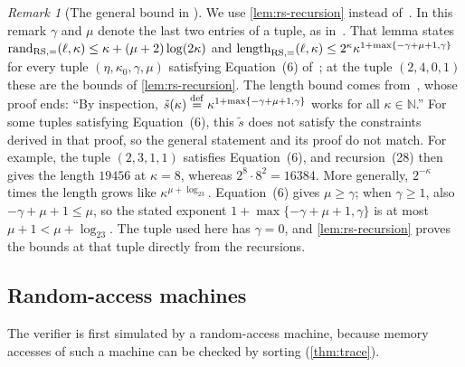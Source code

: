 \documentclass[11pt,letterpaper]{article}
\theoremstyle{definition}
\theoremstyle{remark}
\newtheorem{remark}[theorem]{Remark}
\newcommand{\lgx}{\log_2}
\begin{document}
\begin{remark}[The general bound in {\cite[Lemma~C.1]{BCGT13}}]\label{rem:bcgt-c1}
We use \cref{lem:rs-recursion} instead of~\cite[Lemma~C.1]{BCGT13}.
In this remark \(\gamma\) and \(\mu\) denote the last two entries of a
tuple, as in~\cite{BCGT13}. That lemma states
\(\mathrm{rand}_{\rm RS,=}(\ell,\kappa)\le\kappa+(\mu+2)\log(2\kappa)\)
and
\(\mathrm{length}_{\rm RS,=}(\ell,\kappa)\le
2^\kappa\kappa^{1+\max\{-\gamma+\mu+1,\gamma\}}\) for every tuple
\((\eta,\kappa_0,\gamma,\mu)\) satisfying Equation~(6)
of~\cite[Theorem~11.3]{BCGT13}; at the tuple \((2,4,0,1)\) these are
the bounds of \cref{lem:rs-recursion}. The length bound comes
from~\cite[Lemma~C.10]{BCGT13}, whose proof ends: ``By inspection,
\(\tilde s(\kappa)\stackrel{\rm def}{=}\kappa^{1+\max\{-\gamma+\mu+1,\gamma\}}\)
works for all \(\kappa\in\mathbb N\).'' For some tuples satisfying
Equation~(6), this \(\tilde s\) does not satisfy the constraints derived
in that proof, so the general statement and its proof do not match.
For example, the tuple \((2,3,1,1)\) satisfies Equation~(6), and
recursion~(28) then gives the length \(19456\) at \(\kappa=8\), whereas
\(2^8\cdot8^{2}=16384\). More generally, \(2^{-\kappa}\) times the
length grows like \(\kappa^{\mu+\lgx3}\). Equation~(6) gives
\(\mu\ge\gamma\); when \(\gamma\ge1\), also \(-\gamma+\mu+1\le\mu\), so
the stated exponent \(1+\max\{-\gamma+\mu+1,\gamma\}\) is at most
\(\mu+1<\mu+\lgx3\). The
tuple used here has \(\gamma=0\), and \cref{lem:rs-recursion} proves
the bounds at that tuple directly from the recursions.
\end{remark}

\subsection{Random-access machines}

The verifier is first simulated by a random-access machine, because
memory accesses of such a machine can be checked by sorting
(\cref{thm:trace}).
\end{document}
